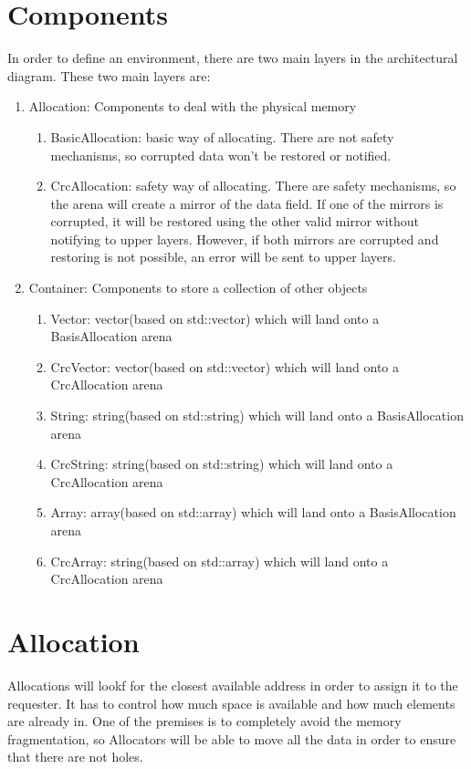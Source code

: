 \documentclass[a4paper,11pt]{article}
\begin{document}
\section{Components}
In order to define an environment, there are two main layers in the architectural diagram. These two main layers are:
          \begin{enumerate}
    	    \item Allocation: Components to deal with the physical memory
	          \begin{enumerate}
	    	    \item BasicAllocation: basic way of allocating. There are not safety mechanisms, so corrupted data won't be restored or notified.
	              \item CrcAllocation: safety way of allocating. There are safety mechanisms, so the arena will create a mirror of the data field. If one of the mirrors is corrupted, it will be restored using the other valid mirror without notifying to upper layers. However, if both mirrors are corrupted and restoring is not possible, an error will be sent to upper layers.
	         \end{enumerate}
              \item Container: Components to store a collection of other objects
	          \begin{enumerate}
	    	    \item Vector: vector(based on std::vector)  which will land onto a BasisAllocation arena
	               \item CrcVector: vector(based on std::vector)  which will land onto a CrcAllocation arena
	               \item String: string(based on std::string)  which will land onto a BasisAllocation arena
	              \item CrcString: string(based on std::string)  which will land onto a CrcAllocation arena
	               \item Array: array(based on std::array)  which will land onto a BasisAllocation arena
	              \item CrcArray: string(based on std::array)  which will land onto a CrcAllocation arena
	         \end{enumerate}
         \end{enumerate}
\section{Allocation}
Allocations will lookf for the closest available address in order to assign it to the requester. It has to control how much space is available and how much elements are already in. One of the premises is to completely avoid the memory fragmentation, so Allocators will be able to move all the data in order to ensure that there are not holes.
\end{document}
